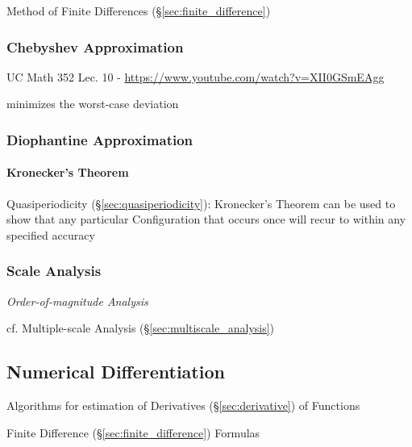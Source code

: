 \fist Method of Finite Differences (\S\ref{sec:finite_difference})



\subsubsection{Chebyshev Approximation}\label{sec:chebyshev_approximation}

UC Math 352 Lec. 10 - \url{https://www.youtube.com/watch?v=XII0GSmEAgg}

minimizes the worst-case deviation



\subsubsection{Diophantine Approximation}\label{sec:diophantine_approximation}

\paragraph{Kronecker's Theorem}\label{sec:kroneckers_theorem}\hfill

Quasiperiodicity (\S\ref{sec:quasiperiodicity}): Kronecker's Theorem can be used
to show that any particular Configuration that occurs once will recur to within
any specified accuracy



\subsubsection{Scale Analysis}\label{sec:scale_analysis}

\emph{Order-of-magnitude Analysis}

cf. Multiple-scale Analysis (\S\ref{sec:multiscale_analysis})



\subsection{Numerical Differentiation}\label{sec:numerical_differentiation}

Algorithms for estimation of Derivatives (\S\ref{sec:derivative}) of Functions

Finite Difference (\S\ref{sec:finite_difference}) Formulas

